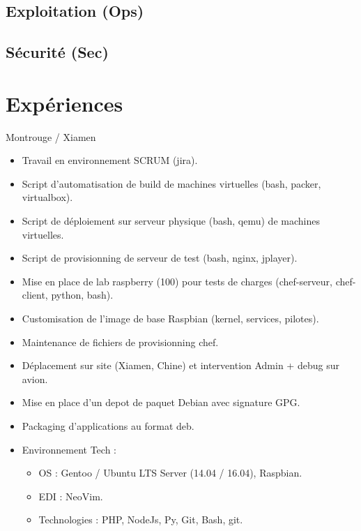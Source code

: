\documentclass[10pt,a4paper,sans]{moderncv}
\begin{document}
\subsection{Exploitation (Ops)}

\subsection{Sécurité (Sec)}

\section{Expériences}

{Montrouge / Xiamen}{
  \begin{itemize}%
    \item Travail en environnement SCRUM (jira).
    \item Script d'automatisation de build de machines virtuelles (bash, packer, virtualbox).
    \item Script de déploiement sur serveur physique (bash, qemu) de machines virtuelles.
    \item Script de provisionning de serveur de test (bash, nginx, jplayer).
    \item Mise en place de lab raspberry (100) pour tests de charges (chef-serveur, chef-client, python, bash).
    \item Customisation de l'image de base Raspbian (kernel, services, pilotes).
    \item Maintenance de fichiers de provisionning chef.
    \item Déplacement sur site (Xiamen, Chine) et intervention Admin + debug sur avion.
    \item Mise en place d'un depot de paquet Debian avec signature GPG.
    \item Packaging d'applications au format deb.
    \item Environnement Tech :
      \begin{itemize}%
        \item OS : Gentoo / Ubuntu LTS Server (14.04 / 16.04), Raspbian.
        \item EDI : NeoVim.
        \item Technologies : PHP, NodeJs, Py, Git, Bash, git.
      \end{itemize}
  \end{itemize}}
\end{document}
